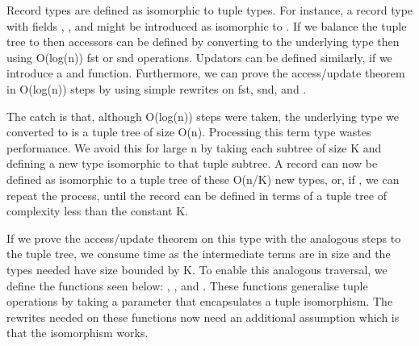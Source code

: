 \begin{isabellebody}
\begin{isamarkuptext}
  Record types are defined as isomorphic to tuple types. For instance,
  a record type with fields , , 
  and  might be introduced as isomorphic to . If we balance the tuple tree to  then accessors can be defined by converting to the
  underlying type then using O(log(n)) fst or snd operations.
  Updators can be defined similarly, if we introduce a  and  function. Furthermore, we can
  prove the access/update theorem in O(log(n)) steps by using simple
  rewrites on fst, snd,  and .

  The catch is that, although O(log(n)) steps were taken, the
  underlying type we converted to is a tuple tree of size
  O(n). Processing this term type wastes performance. We avoid this
  for large n by taking each subtree of size K and defining a new type
  isomorphic to that tuple subtree. A record can now be defined as
  isomorphic to a tuple tree of these O(n/K) new types, or, if , we can repeat the process, until the record can be
  defined in terms of a tuple tree of complexity less than the
  constant K.

  If we prove the access/update theorem on this type with the
  analogous steps to the tuple tree, we consume 
  time as the intermediate terms are  in size and
  the types needed have size bounded by K.  To enable this analogous
  traversal, we define the functions seen below: , , 
  and . These functions generalise tuple
  operations by taking a parameter that encapsulates a tuple
  isomorphism.  The rewrites needed on these functions now need an
  additional assumption which is that the isomorphism works.


\end{isamarkuptext}
\end{isabellebody}
